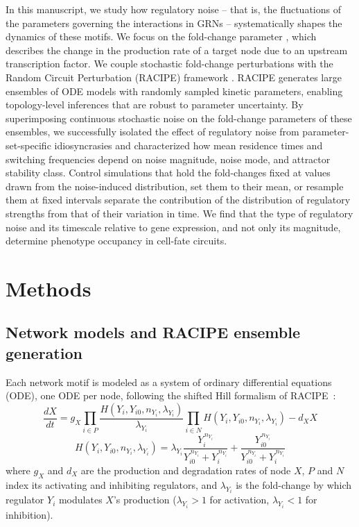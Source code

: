\documentclass[11pt]{article}
\begin{document}
In this manuscript, we study how regulatory noise – that is, the fluctuations of the parameters governing the interactions in GRNs – systematically shapes the dynamics of these motifs. We focus on the fold-change parameter \cite{Huang2017}, which describes the change in the production rate of a target node due to an upstream transcription factor. We couple stochastic fold-change perturbations with the Random Circuit Perturbation (RACIPE) framework \cite{Huang2017}. RACIPE generates large ensembles of ODE models with randomly sampled kinetic parameters, enabling topology-level inferences that are robust to parameter uncertainty. By superimposing continuous stochastic noise on the fold-change parameters of these ensembles, we successfully isolated the effect of regulatory noise from parameter-set-specific idiosyncrasies and characterized how mean residence times and switching frequencies depend on noise magnitude, noise mode, and attractor stability class. Control simulations that hold the fold-changes fixed at values drawn from the noise-induced distribution, set them to their mean, or resample them at fixed intervals separate the contribution of the distribution of regulatory strengths from that of their variation in time. We find that the type of regulatory noise and its timescale relative to gene expression, and not only its magnitude, determine phenotype occupancy in cell-fate circuits.

\section{Methods}

\subsection{Network models and RACIPE ensemble generation}\label{sec:RACIPE}

Each network motif is modeled as a system of ordinary differential equations (ODE), one ODE per node, following the shifted Hill formalism of RACIPE~\cite{Huang2017}:
\begin{equation}
\frac{dX}{dt} = g_X \prod_{i \in P} \frac{H(Y_i, Y_{i0}, n_{Y_i}, \lambda_{Y_i})}{\lambda_{Y_i}} \prod_{i \in N} H(Y_i, Y_{i0}, n_{Y_i}, \lambda_{Y_i}) - d_X X
\label{eq:odeM}
\end{equation}
\begin{equation}
H(Y_i, Y_{i0}, n_{Y_i}, \lambda_{Y_i}) = \lambda_{Y_i} \frac{Y_i^{\,n_{Y_i}}}{Y_{i0}^{\,n_{Y_i}} + Y_i^{\,n_{Y_i}}} + \frac{Y_{i0}^{\,n_{Y_i}}}{Y_{i0}^{\,n_{Y_i}} + Y_i^{\,n_{Y_i}}}
\label{eq:hillM}
\end{equation}
where $g_X$ and $d_X$ are the production and degradation rates of node $X$, $P$ and $N$ index its activating and inhibiting regulators, and $\lambda_{Y_i}$ is the fold-change by which regulator $Y_i$ modulates $X$'s production ($\lambda_{Y_i} > 1$ for activation, $\lambda_{Y_i} < 1$ for inhibition).
\end{document}
